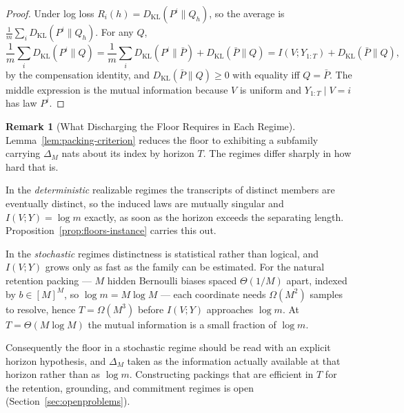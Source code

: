 \documentclass[12pt]{article}
\theoremstyle{definition}
\newtheorem{remark}[theorem]{Remark}
\newcommand{\KL}{D_{\mathrm{KL}}}
\begin{document}
\begin{proof}
Under log loss $R_i(h)=\KL(P^i\|Q_h)$, so the average is
$\frac1m\sum_i\KL(P^i\|Q_h)$.  For any $Q$,
\[
\frac1m\sum_i\KL(P^i\|Q)
=
\frac1m\sum_i\KL(P^i\|\bar P)+\KL(\bar P\|Q)
=
I(V;Y_{1:T})+\KL(\bar P\|Q),
\]
by the compensation identity, and $\KL(\bar P\|Q)\ge0$ with equality iff
$Q=\bar P$.  The middle expression is the mutual information because $V$ is
uniform and $Y_{1:T}\mid V=i$ has law $P^i$.
\end{proof}

\begin{remark}[What Discharging the Floor Requires in Each Regime]
\label{rem:packing-per-regime}
Lemma~\ref{lem:packing-criterion} reduces the floor to exhibiting a subfamily
carrying $\Delta_M$ nats about its index by horizon $T$.  The regimes differ
sharply in how hard that is.

In the \emph{deterministic} realizable regimes the transcripts of distinct
members are eventually distinct, so the induced laws are mutually singular and
$I(V;Y)=\log m$ exactly, as soon as the horizon exceeds the separating length.
Proposition~\ref{prop:floors-instance} carries this out.

In the \emph{stochastic} regimes distinctness is statistical rather than
logical, and $I(V;Y)$ grows only as fast as the family can be estimated.  For
the natural retention packing --- $M$ hidden Bernoulli biases spaced
$\Theta(1/M)$ apart, indexed by $b\in[M]^M$, so $\log m=M\log M$ --- each
coordinate needs $\Omega(M^2)$ samples to resolve, hence
$T=\Omega(M^3)$ before $I(V;Y)$ approaches $\log m$.  At $T=\Theta(M\log M)$
the mutual information is a small fraction of $\log m$.

Consequently the floor in a stochastic regime should be read with an explicit
horizon hypothesis, and $\Delta_M$ taken as the information actually available
at that horizon rather than as $\log m$.  Constructing packings that are
efficient in $T$ for the retention, grounding, and commitment regimes is open
(Section~\ref{sec:openproblems}).
\end{remark}
\end{document}
